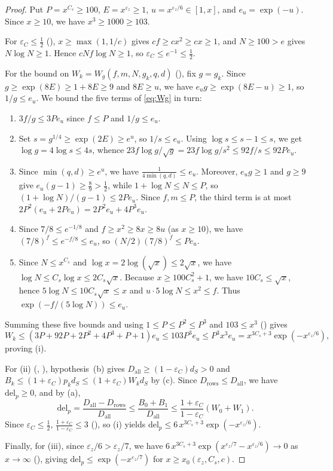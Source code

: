 \documentclass[11pt]{amsart}
\newcommand{\eps}{\varepsilon}
\theoremstyle{plain}
\theoremstyle{definition}
\numberwithin{equation}{section}
\begin{document}
\begin{proof}
Put $P=x^{C_s}\ge 100$, $E=x^{\eps_z}\ge 1$, $u=x^{\eps_z/6}\in[1,x]$, and $e_u=\exp(-u)$. Since
$x\ge 10$, we have $x^3\ge 1000\ge 103$.

For $\varepsilon_C\le\frac12$ (), $x\ge\max(1,1/c)$ gives
$c f\ge c x^2\ge c x\ge 1$, and $N\ge 100>e$ gives $N\log N\ge 1$. Hence
$c N f\log N\ge 1$, so $\varepsilon_C\le e^{-1}\le\frac12$.

For the bound on $W_k=W_g(f,m,N,g_k,q,d)$ (), fix $g=g_k$. Since
$g\ge\exp(8E)\ge 1+8E\ge 9$ and $8E\ge u$, we have $e_u g\ge\exp(8E-u)\ge 1$, so $1/g\le e_u$. We
bound the five terms of \eqref{eq:Wg} in turn:
\begin{enumerate}[label=\arabic*.]
\item $3f/g\le 3P e_u$ since $f\le P$ and $1/g\le e_u$.
\item Set $s=g^{1/4}\ge\exp(2E)\ge e^u$, so $1/s\le e_u$. Using $\log s\le s-1\le s$, we get
  $\log g=4\log s\le 4s$, whence $23f\log g/\sqrt{g}=23f\log g/s^2\le 92f/s\le 92P e_u$.
\item Since $\min(q,d)\ge e^u$, we have $\frac{1}{4\min(q,d)}\le e_u$. Moreover, $e_u g\ge 1$ and
  $g\ge 9$ give $e_u(g-1)\ge\frac{8}{9}>\frac12$, while $1+\log N\le N\le P$, so
  $(1+\log N)/(g-1)\le 2P e_u$. Since $f,m\le P$, the third term is at most
  $2P^2(e_u+2P e_u)=2P^2 e_u+4P^3 e_u$.
\item Since $7/8\le e^{-1/8}$ and $f\ge x^2\ge 8x\ge 8u$ (as $x\ge 10$), we have
  $(7/8)^f\le e^{-f/8}\le e_u$, so $(N/2)(7/8)^f\le P e_u$.
\item Since $N\le x^{C_s}$ and $\log x=2\log(\sqrt x)\le 2\sqrt x$, we have
  $\log N\le C_s\log x\le 2 C_s\sqrt x$. Because $x\ge 100 C_s^2+1$, we have $10 C_s\le\sqrt x$,
  hence $5\log N\le 10 C_s\sqrt x\le x$ and $u\cdot 5\log N\le x^2\le f$. Thus
  $\exp(-f/(5\log N))\le e_u$.
\end{enumerate}
Summing these five bounds and using $1\le P\le P^2\le P^3$ and $103\le x^3$ () gives
\[
W_k\le (3P+92P+2P^2+4P^3+P+1)e_u\le 103 P^3 e_u\le P^3 x^3 e_u=x^{3C_s+3}\exp(-x^{\eps_z/6}),
\]
proving (i).

For (ii) (, ), hypothesis~(b) gives
$D_{\mathrm{all}}\ge(1-\varepsilon_C)d_S>0$ and $B_k\le(1+\varepsilon_C)p_k d_S\le(1+\varepsilon_C)W_k d_S$
by (c). Since $D_{\mathrm{rows}}\le D_{\mathrm{all}}$, we have $\mathrm{del}_p\ge 0$, and by (a),
\[
\mathrm{del}_p=\frac{D_{\mathrm{all}}-D_{\mathrm{rows}}}{D_{\mathrm{all}}}
\le\frac{B_0+B_1}{D_{\mathrm{all}}}
\le\frac{1+\varepsilon_C}{1-\varepsilon_C}(W_0+W_1).
\]
Since $\varepsilon_C\le\frac12$, $\frac{1+\varepsilon_C}{1-\varepsilon_C}\le 3$
(), so (i) yields $\mathrm{del}_p\le 6\,x^{3C_s+3}\exp(-x^{\eps_z/6})$.

Finally, for (iii), since $\eps_z/6>\eps_z/7$, we have $6\,x^{3C_s+3}\exp(x^{\eps_z/7}-x^{\eps_z/6})\to 0$
as $x\to\infty$ (), giving $\mathrm{del}_p\le\exp(-x^{\eps_z/7})$
for $x\ge x_0(\eps_z,C_s,c)$.
\end{proof}
\end{document}
